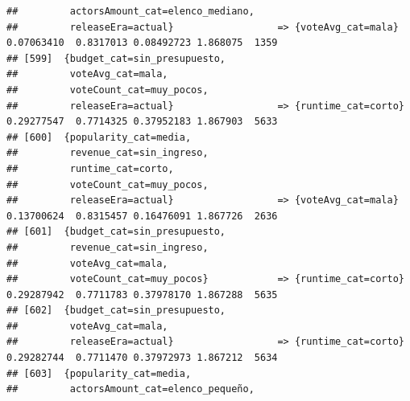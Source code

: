 \documentclass[
]{article}
\begin{document}
\begin{verbatim}
##         actorsAmount_cat=elenco_mediano,                                                                                        
##         releaseEra=actual}                  => {voteAvg_cat=mala}                0.07063410  0.8317013 0.08492723 1.868075  1359
## [599]  {budget_cat=sin_presupuesto,                                                                                             
##         voteAvg_cat=mala,                                                                                                       
##         voteCount_cat=muy_pocos,                                                                                                
##         releaseEra=actual}                  => {runtime_cat=corto}               0.29277547  0.7714325 0.37952183 1.867903  5633
## [600]  {popularity_cat=media,                                                                                                   
##         revenue_cat=sin_ingreso,                                                                                                
##         runtime_cat=corto,                                                                                                      
##         voteCount_cat=muy_pocos,                                                                                                
##         releaseEra=actual}                  => {voteAvg_cat=mala}                0.13700624  0.8315457 0.16476091 1.867726  2636
## [601]  {budget_cat=sin_presupuesto,                                                                                             
##         revenue_cat=sin_ingreso,                                                                                                
##         voteAvg_cat=mala,                                                                                                       
##         voteCount_cat=muy_pocos}            => {runtime_cat=corto}               0.29287942  0.7711783 0.37978170 1.867288  5635
## [602]  {budget_cat=sin_presupuesto,                                                                                             
##         voteAvg_cat=mala,                                                                                                       
##         releaseEra=actual}                  => {runtime_cat=corto}               0.29282744  0.7711470 0.37972973 1.867212  5634
## [603]  {popularity_cat=media,                                                                                                   
##         actorsAmount_cat=elenco_pequeño,                                                                                        

\end{verbatim}
\end{document}
